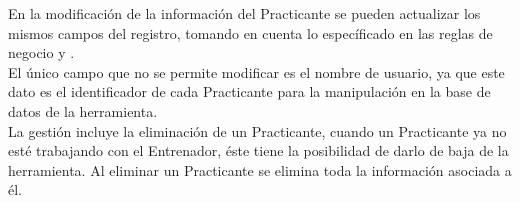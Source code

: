 En la modificación de la información del Practicante se pueden actualizar los mismos campos del registro, tomando en cuenta lo específicado en las reglas de negocio  y .\\
El único campo que no se permite modificar es el nombre de usuario, ya que este dato es el identificador de cada Practicante para la manipulación en la base de datos de la herramienta. \\

La gestión incluye la eliminación de un Practicante, cuando un Practicante ya no esté trabajando con el Entrenador, éste tiene la posibilidad  de darlo de baja de la herramienta. Al eliminar un Practicante se elimina toda la información asociada a él. \\
